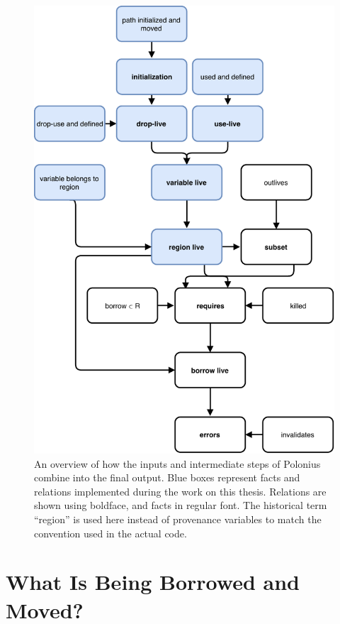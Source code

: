 \documentclass[11pt,a4paper,twoside,openany]{report}
\begin{document}
\begin{figure}
  \includegraphics[width=0.9\linewidth]{Graphs/polonius-overview}
  \caption[Flowchart of the Polonius Inputs and Outputs]{An overview of how the
    inputs and intermediate steps of Polonius combine into the final output.
    Blue boxes represent facts and relations implemented during the work on this
    thesis. Relations are shown using boldface, and facts in regular font. The
    historical term ``region'' is used here instead of provenance variables to
    match the convention used in the actual code.}
  \label{fig:polonius-overview}
\end{figure}

\section{What Is Being Borrowed and Moved?}\label{sec:paths}
\end{document}
